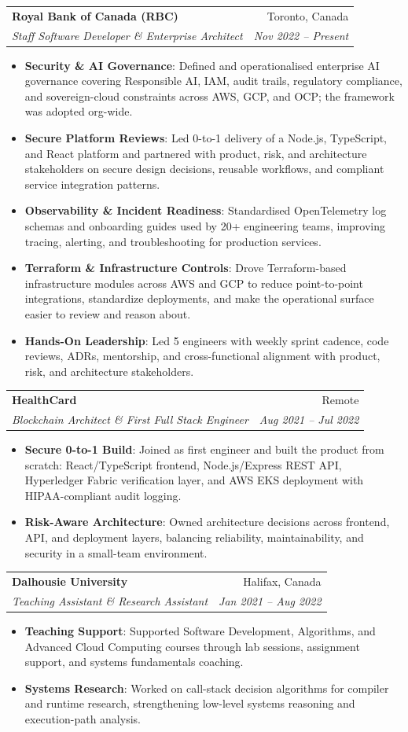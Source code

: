 \documentclass[letterpaper,9.5pt]{article}
\makeatletter
\newcommand{\resumeItem}[2]{
  \item\small{
    \textbf{#1}{: #2 \vspace{-2pt}}
  }
}
\newcommand{\resumeSubheading}[4]{
  \vspace{-1pt}\item
    \begin{tabular*}{0.97\textwidth}{l@{\extracolsep{\fill}}r}
      \textbf{#1} & #2 \\
      \textit{\small#3} & \textit{\small #4} \\
    \end{tabular*}\vspace{-5pt}
}
\newcommand{\resumeItemListStart}{\begin{itemize}}
\newcommand{\resumeItemListEnd}{\end{itemize}\vspace{-5pt}}
\makeatother
\begin{document}
  \resumeSubheading
    {Royal Bank of Canada (RBC)}{Toronto, Canada}
    {Staff Software Developer \& Enterprise Architect}{Nov 2022 -- Present}
    \resumeItemListStart
      \resumeItem{Security \& AI Governance}
        {Defined and operationalised enterprise AI governance covering Responsible AI, IAM, audit trails, regulatory compliance, and sovereign-cloud constraints across AWS, GCP, and OCP; the framework was adopted org-wide.}
      \resumeItem{Secure Platform Reviews}
        {Led 0-to-1 delivery of a Node.js, TypeScript, and React platform and partnered with product, risk, and architecture stakeholders on secure design decisions, reusable workflows, and compliant service integration patterns.}
      \resumeItem{Observability \& Incident Readiness}
        {Standardised OpenTelemetry log schemas and onboarding guides used by 20+ engineering teams, improving tracing, alerting, and troubleshooting for production services.}
      \resumeItem{Terraform \& Infrastructure Controls}
        {Drove Terraform-based infrastructure modules across AWS and GCP to reduce point-to-point integrations, standardize deployments, and make the operational surface easier to review and reason about.}
      \resumeItem{Hands-On Leadership}
        {Led 5 engineers with weekly sprint cadence, code reviews, ADRs, mentorship, and cross-functional alignment with product, risk, and architecture stakeholders.}
    \resumeItemListEnd

  \resumeSubheading
    {HealthCard}{Remote}
    {Blockchain Architect \& First Full Stack Engineer}{Aug 2021 -- Jul 2022}
    \resumeItemListStart
      \resumeItem{Secure 0-to-1 Build}
        {Joined as first engineer and built the product from scratch: React/TypeScript frontend, Node.js/Express REST API, Hyperledger Fabric verification layer, and AWS EKS deployment with HIPAA-compliant audit logging.}
      \resumeItem{Risk-Aware Architecture}
        {Owned architecture decisions across frontend, API, and deployment layers, balancing reliability, maintainability, and security in a small-team environment.}
    \resumeItemListEnd

  \resumeSubheading
    {Dalhousie University}{Halifax, Canada}
    {Teaching Assistant \& Research Assistant}{Jan 2021 -- Aug 2022}
    \resumeItemListStart
      \resumeItem{Teaching Support}
        {Supported Software Development, Algorithms, and Advanced Cloud Computing courses through lab sessions, assignment support, and systems fundamentals coaching.}
      \resumeItem{Systems Research}
        {Worked on call-stack decision algorithms for compiler and runtime research, strengthening low-level systems reasoning and execution-path analysis.}
    \resumeItemListEnd
\end{document}
